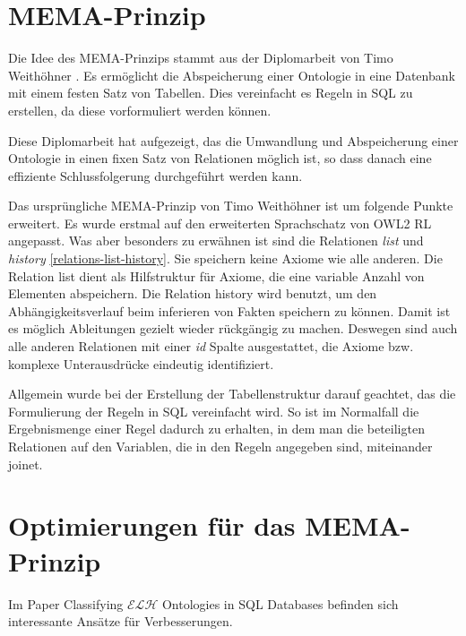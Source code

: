 \section{MEMA-Prinzip}
\label{abschnitt-mema-prinzip}
Die Idee des MEMA-Prinzips stammt aus der Diplomarbeit von Timo Weithöhner \cite{Weithoehner2003}. Es ermöglicht die Abspeicherung einer Ontologie in eine Datenbank mit einem festen Satz von Tabellen. Dies vereinfacht es Regeln in SQL zu erstellen, da diese vorformuliert werden können.

Diese Diplomarbeit hat aufgezeigt, das die Umwandlung und Abspeicherung einer Ontologie in einen fixen Satz von Relationen möglich ist, so dass danach eine effiziente Schlussfolgerung durchgeführt werden kann.

Das ursprüngliche MEMA-Prinzip von Timo Weithöhner ist um folgende Punkte erweitert.
Es wurde erstmal auf den erweiterten Sprachschatz von OWL2 RL angepasst. Was aber besonders zu erwähnen ist sind die Relationen \emph{list} und \emph{history} \ref{relations-list-history}. Sie speichern keine Axiome wie alle anderen. Die Relation list dient als Hilfstruktur für Axiome, die eine variable Anzahl von Elementen abspeichern. Die Relation history wird benutzt, um den Abhängigkeitsverlauf beim inferieren von Fakten speichern zu können. Damit ist es möglich Ableitungen gezielt wieder rückgängig zu machen. Deswegen sind auch alle anderen Relationen mit einer \emph{id} Spalte ausgestattet, die Axiome bzw. komplexe Unterausdrücke eindeutig identifiziert.

Allgemein wurde bei der Erstellung der Tabellenstruktur darauf geachtet, das die Formulierung der Regeln in SQL vereinfacht wird. So ist im Normalfall die Ergebnismenge einer Regel dadurch zu erhalten, in dem man die beteiligten Relationen auf den Variablen, die in den Regeln angegeben sind, miteinander joinet.



\section{Optimierungen für das MEMA-Prinzip}

Im Paper Classifying $\mathcal{ELH}$ Ontologies in SQL Databases \cite{Delaitre2009} befinden sich interessante Ansätze für Verbesserungen.

